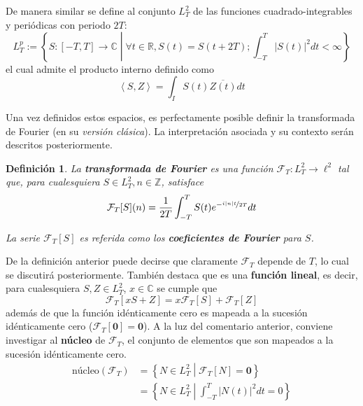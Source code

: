 \documentclass[12pt,letterpaper,draft]{book}
\newtheorem{definicion}{Definición}[chapter]
\newcommand{\R}{\mathbb{R}}
\newcommand{\C}{\mathbb{C}}
\newcommand{\Z}{\mathbb{Z}}
\newcommand{\simint}[1]{\int_{- #1 }^{ #1 }}
\newcommand{\abso}[1]{\left| #1 \right|}
\newcommand{\talque}{\mathrel{}\middle|\mathrel{}}
\begin{document}
De manera similar se define al conjunto $L^{2}_T$ de las funciones cuadrado-integrables y periódicas con periodo $2T$:
\begin{equation}
L^{p}_T := \left\{ S: [-T,T]\rightarrow\C \talque \forall t\in \R, S(t) = S(t+2T) ;  \int_{-T}^{T} \abso{S(t)}^{2} dt < \infty \right\}
\end{equation}
el cual admite el producto interno definido como
\begin{equation}
\left\langle S,Z \right\rangle = \int_I S(t) \overline{Z(t)} dt
\end{equation}

Una vez definidos estos espacios, es perfectamente posible definir la transformada de Fourier (en su \textit{versión clásica}). 
%
La interpretación asociada y su contexto serán descritos posteriormente.

\begin{definicion}
La \textbf{transformada de Fourier} es una función $\mathcal{F}_T : L^{2}_T \rightarrow \ell^{2}$ tal que, para cualesquiera $S\in L^{2}_T, n\in \Z$, satisface
\begin{equation}
\mathcal{F}_T[S](n) = \frac{1}{2 T} \simint{T} S(t) e^{-\nicefrac{ i \abso{n} t}{2T}} dt
\end{equation}

La serie $\mathcal{F}_T[S]$ es referida como los \textbf{coeficientes de Fourier} para $S$.
\end{definicion}

De la definición anterior puede decirse que claramente $\mathcal{F}_T$ depende de $T$, lo cual se discutirá posteriormente.
%
También destaca que es una \textbf{función lineal}, es decir, para cualesquiera $S, Z \in L^{2}_T$, $x\in \C$ se cumple que
\begin{equation}
\mathcal{F}_T[xS + Z] = x\mathcal{F}_T[S] + \mathcal{F}_T[Z]
\end{equation}
además de que la función idénticamente cero es mapeada a la sucesión idénticamente cero ($\mathcal{F}_T[\boldsymbol{0}]=\boldsymbol{0}$).
%
A la luz del comentario anterior, conviene investigar al \textbf{núcleo} de $\mathcal{F}_T$, el conjunto de elementos que son mapeados a la sucesión idénticamente cero.
%
\begin{align}
\text{núcleo}(\mathcal{F}_T) &= \left\{ N\in L^{2}_T \talque \mathcal{F}_T[N] = \boldsymbol{0}  \right\} \\
&= \left\{ N\in L^{2}_T \talque \simint{T} \abso{N(t)}^{2} dt = 0 \right\}
\end{align}
\end{document}

